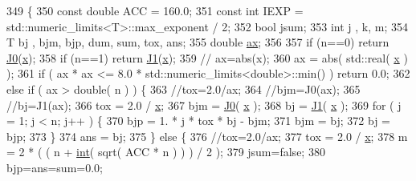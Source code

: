 \begin{DoxyCode}
349       \{
350         \textcolor{keyword}{const} \textcolor{keywordtype}{double} ACC = 160.0;
351         \textcolor{keyword}{const} \textcolor{keywordtype}{int} IEXP = std::numeric\_limits<T>::max\_exponent / 2;
352         \textcolor{keywordtype}{bool} jsum;
353         \textcolor{keywordtype}{int} j , k, m;
354         T bj , bjm, bjp, dum, sum, tox, ans;
355         \textcolor{keywordtype}{double} \hyperlink{structLuna_1_1Bessel_ace7f3d0a3d4fcca01955bd95cdede89a}{ax};
356 
357         \textcolor{keywordflow}{if} (n==0) \textcolor{keywordflow}{return} \hyperlink{structLuna_1_1Bessel_a8eeb87d47905d77825276a27ff59de12}{J0}(\hyperlink{namespaceHeat__plot_aa88370c16b85b784ccbde3ed88bc1991}{x});
358         \textcolor{keywordflow}{if} (n==1) \textcolor{keywordflow}{return} \hyperlink{structLuna_1_1Bessel_aa9666abfed63d6b97db0b2b776135ef4}{J1}(\hyperlink{namespaceHeat__plot_aa88370c16b85b784ccbde3ed88bc1991}{x});
359         \textcolor{comment}{// ax=abs(x);}
360         ax = abs( std::real( \hyperlink{namespaceHeat__plot_aa88370c16b85b784ccbde3ed88bc1991}{x} ) );
361         \textcolor{keywordflow}{if} ( ax * ax <= 8.0 * std::numeric\_limits<double>::min() ) \textcolor{keywordflow}{return} 0.0;
362         \textcolor{keywordflow}{else} \textcolor{keywordflow}{if} ( ax > \textcolor{keywordtype}{double}( n ) ) \{
363             \textcolor{comment}{//tox=2.0/ax;}
364             \textcolor{comment}{//bjm=J0(ax);}
365             \textcolor{comment}{//bj=J1(ax);}
366           tox = 2.0 / \hyperlink{namespaceHeat__plot_aa88370c16b85b784ccbde3ed88bc1991}{x};
367           bjm = \hyperlink{structLuna_1_1Bessel_a8eeb87d47905d77825276a27ff59de12}{J0}( \hyperlink{namespaceHeat__plot_aa88370c16b85b784ccbde3ed88bc1991}{x} );
368           bj = \hyperlink{structLuna_1_1Bessel_aa9666abfed63d6b97db0b2b776135ef4}{J1}( \hyperlink{namespaceHeat__plot_aa88370c16b85b784ccbde3ed88bc1991}{x} );
369             \textcolor{keywordflow}{for} ( j = 1; j < n; j++ ) \{
370                 bjp = 1. * j * tox * bj - bjm;
371                 bjm = bj;
372                 bj = bjp;
373             \}
374             ans = bj;
375         \} \textcolor{keywordflow}{else} \{
376             \textcolor{comment}{//tox=2.0/ax;}
377           tox = 2.0 / \hyperlink{namespaceHeat__plot_aa88370c16b85b784ccbde3ed88bc1991}{x};
378             m = 2 * ( ( n + \hyperlink{namespaceHeat__plot_ac721620fed23609e47f849d804f29546}{int}( sqrt( ACC * n ) ) ) / 2 );
379             jsum=\textcolor{keyword}{false};
380             bjp=ans=sum=0.0;

\end{DoxyCode}
